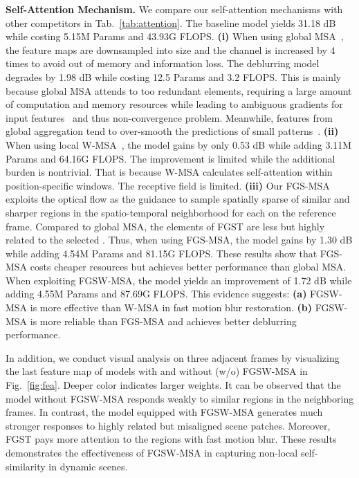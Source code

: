 \documentclass{article}
\begin{document}
	\noindent\textbf{Self-Attention Mechanism.} We compare our self-attention mechanisms with other competitors in Tab.~\ref{tab:attention}. The baseline model yields 31.18 dB while costing 5.15M Params and 43.93G FLOPS. \textbf{(i)} When using global MSA~\cite{global_msa}, the feature maps are downsampled into  size and the channel is increased by 4 times to avoid out of memory and information loss. The deblurring model degrades by 1.98 dB while costing 12.5 Params and 3.2 FLOPS. This is mainly because global MSA attends to too redundant  elements, requiring a large amount of computation and memory resources while leading to ambiguous gradients for input features~\cite{de_detr} and thus non-convergence problem. Meanwhile, features from global aggregation tend to over-smooth the predictions of small patterns~\cite{xiangtl_gald}. \textbf{(ii)} When using local W-MSA~\cite{liu2021swin}, the model gains by only 0.53 dB while adding 3.11M Params and 64.16G FLOPS. The improvement is limited while the additional burden is nontrivial. That is because W-MSA calculates self-attention within position-specific windows. The receptive field is limited. \textbf{(iii)} Our FGS-MSA exploits the optical flow as the guidance to sample spatially sparse  of similar and sharper regions in the spatio-temporal neighborhood for each  on the reference frame. Compared to global MSA, the  elements of FGST are less but highly related to the selected . Thus, when using FGS-MSA, the model gains by 1.30 dB while adding 4.54M Params and 81.15G FLOPS. These results show that FGS-MSA costs cheaper resources but achieves better performance than global MSA. When exploiting FGSW-MSA, the model yields an improvement of 1.72 dB while adding 4.55M Params and 87.69G FLOPS. This evidence suggests: \textbf{(a)} FGSW-MSA is more effective than W-MSA in fast motion blur restoration. \textbf{(b)} FGSW-MSA is more reliable than FGS-MSA and achieves better deblurring performance.
	
	In addition, we conduct visual analysis on three adjacent frames by visualizing the last feature map of models with and without (w/o) FGSW-MSA in Fig.~\ref{fig:fea}. Deeper color indicates larger weights. It can be observed that the model without FGSW-MSA responds weakly to similar regions in the neighboring frames. In contrast, the model equipped with FGSW-MSA generates much stronger responses to highly related but misaligned scene patches. Moreover, FGST pays more attention to the regions with fast motion blur. These results demonstrates the effectiveness of FGSW-MSA in capturing non-local self-similarity in dynamic scenes.
	
\end{document}
